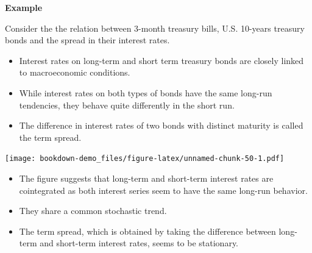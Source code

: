 \documentclass[]{book}
\newenvironment{Shaded}{\begin{snugshade}}{\end{snugshade}}
\newcommand{\CommentTok}[1]{\textcolor[rgb]{0.56,0.35,0.01}{\textit{#1}}}
\newcommand{\DataTypeTok}[1]{\textcolor[rgb]{0.13,0.29,0.53}{#1}}
\newcommand{\KeywordTok}[1]{\textcolor[rgb]{0.13,0.29,0.53}{\textbf{#1}}}
\newcommand{\NormalTok}[1]{#1}
\newcommand{\OperatorTok}[1]{\textcolor[rgb]{0.81,0.36,0.00}{\textbf{#1}}}
\newcommand{\OtherTok}[1]{\textcolor[rgb]{0.56,0.35,0.01}{#1}}
\newcommand{\StringTok}[1]{\textcolor[rgb]{0.31,0.60,0.02}{#1}}
\providecommand{\tightlist}{%
  \setlength{\itemsep}{0pt}\setlength{\parskip}{0pt}}
\begin{document}
\textbf{Example}

Consider the the relation between 3-month treasury bills, U.S. 10-years treasury bonds and the spread in their interest rates.

\begin{itemize}
\tightlist
\item
  Interest rates on long-term and short term treasury bonds are closely linked to macroeconomic conditions.
\item
  While interest rates on both types of bonds have the same long-run tendencies, they behave quite differently in the short run.
\item
  The difference in interest rates of two bonds with distinct maturity is called the term spread.
\end{itemize}

\begin{Shaded}
\end{Shaded}

\texttt{[image: bookdown-demo\_files/figure-latex/unnamed-chunk-50-1.pdf]}

\begin{itemize}
\tightlist
\item
  The figure suggests that long-term and short-term interest rates are cointegrated as both interest series seem to have the same long-run behavior.
\item
  They share a common stochastic trend.
\item
  The term spread, which is obtained by taking the difference between long-term and short-term interest rates, seems to be stationary.
\end{itemize}
\end{document}
